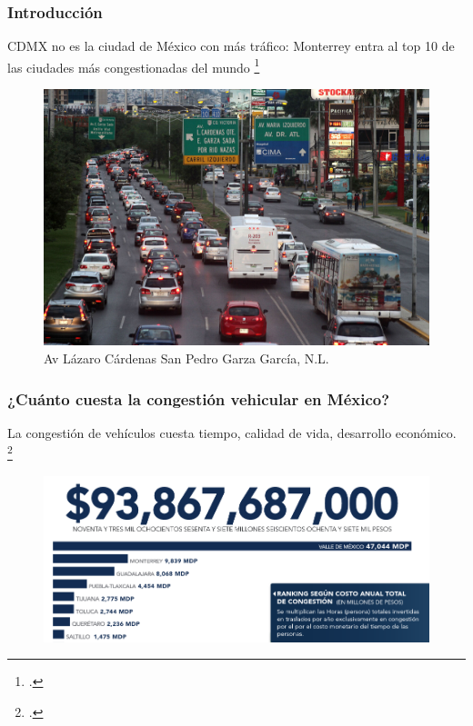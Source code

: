 \documentclass[
	11pt, %
]{beamer}
\begin{document}

\begin{frame}
  \frametitle{Introducción}
  
  {\footnotesize CDMX no es la ciudad de México con más tráfico: Monterrey entra al top 10 de las ciudades más congestionadas del mundo} \footcite{xataka}
  \begin{figure}
    \includegraphics[width=0.6\linewidth]{trafico.jpeg}
    \caption{Av Lázaro Cárdenas San Pedro Garza García, N.L.}
  \end{figure}
  
\end{frame}

\begin{frame}
  \frametitle{¿Cuánto cuesta la congestión vehicular en México?}
             {\footnotesize La congestión de vehículos cuesta tiempo, calidad de vida, desarrollo económico.} \footcite{imco}
             
  \begin{figure}
    \includegraphics[width=0.9\linewidth]{costo_movilidad.png}
  \end{figure}
  
\end{frame}
\end{document}
